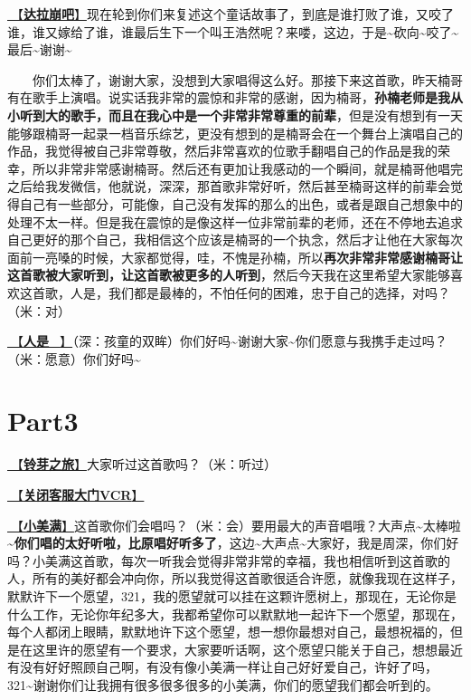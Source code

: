 \documentclass[]{ctexbook}
\begin{document}
\hyperref[dalabengba]{🎵【\textbf{达拉崩吧}】}现在轮到你们来复述这个童话故事了，到底是谁打败了谁，又咬了谁，谁又嫁给了谁，谁最后生下一个叫王浩然呢？来喽，这边，于是\textasciitilde 砍向\textasciitilde 咬了\textasciitilde 最后\textasciitilde 谢谢\textasciitilde{}

  你们太棒了，谢谢大家，没想到大家唱得这么好。那接下来这首歌，昨天楠哥有在歌手上演唱。说实话我非常的震惊和非常的感谢，因为楠哥，\textbf{孙楠老师是我从小听到大的歌手，而且在我心中是一个非常非常尊重的前辈}，但是没有想到有一天能够跟楠哥一起录一档音乐综艺，更没有想到的是楠哥会在一个舞台上演唱自己的作品，我觉得被自己非常尊敬，然后非常喜欢的位歌手翻唱自己的作品是我的荣幸，所以非常非常感谢楠哥。然后还有更加让我感动的一个瞬间，就是楠哥他唱完之后给我发微信，他就说，深深，那首歌非常好听，然后甚至楠哥这样的前辈会觉得自己有一些部分，可能像，自己没有发挥的那么的出色，或者是跟自己想象中的处理不太一样。但是我在震惊的是像这样一位非常前辈的老师，还在不停地去追求自己更好的那个自己，我相信这个应该是楠哥的一个执念，然后才让他在大家每次面前一亮嗓的时候，大家都觉得，哇，不愧是孙楠，所以\textbf{再次非常非常感谢楠哥让这首歌被大家听到，让这首歌被更多的人听到}，然后今天我在这里希望大家能够喜欢这首歌，人是，我们都是最棒的，不怕任何的困难，忠于自己的选择，对吗？（米：对）

\hyperref[renshi]{🎵【\textbf{人是\_}】}（深：孩童的双眸）你们好吗\textasciitilde 谢谢大家\textasciitilde 你们愿意与我携手走过吗？（米：愿意）你们好吗\textasciitilde{}

\section{Part3}\label{chengdu-20240615-part3}

\hyperref[travel-lingya]{🎵【\textbf{铃芽之旅}】}大家听过这首歌吗？（米：听过）

\hyperref[close-door-vcr]{🎥【\textbf{关闭客服大门VCR}】}

\hyperref[happy-ending]{🎵【\textbf{小美满}】}这首歌你们会唱吗？（米：会）要用最大的声音唱哦？大声点\textasciitilde 太棒啦\textasciitilde{}\textbf{你们唱的太好听啦，比原唱好听多了}，这边\textasciitilde 大声点\textasciitilde 大家好，我是周深，你们好吗？小美满这首歌，每次一听我会觉得非常非常的幸福，我也相信听到这首歌的人，所有的美好都会冲向你，所以我觉得这首歌很适合许愿，就像我现在这样子，默默许下一个愿望，321，我的愿望就可以挂在这颗许愿树上，那现在，无论你是什么工作，无论你年纪多大，我都希望你可以默默地一起许下一个愿望，那现在，每个人都闭上眼睛，默默地许下这个愿望，想一想你最想对自己，最想祝福的，但是在这里许的愿望有一个要求，大家要听话啊，这个愿望只能关于自己，想想最近有没有好好照顾自己啊，有没有像小美满一样让自己好好爱自己，许好了吗，321\textasciitilde 谢谢你们让我拥有很多很多很多的小美满，你们的愿望我们都会听到的。
\end{document}

